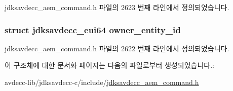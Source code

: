jdksavdecc\+\_\+aem\+\_\+command.\+h 파일의 2623 번째 라인에서 정의되었습니다.

\subsubsection[{\texorpdfstring{owner\+\_\+entity\+\_\+id}{owner_entity_id}}]{\setlength{\rightskip}{0pt plus 5cm}struct {\bf jdksavdecc\+\_\+eui64} owner\+\_\+entity\+\_\+id}\hypertarget{structjdksavdecc__aem__command__acquire__entity_aae4e95a44a1a5e23f8e4415c32aed989}{}\label{structjdksavdecc__aem__command__acquire__entity_aae4e95a44a1a5e23f8e4415c32aed989}


jdksavdecc\+\_\+aem\+\_\+command.\+h 파일의 2622 번째 라인에서 정의되었습니다.



이 구조체에 대한 문서화 페이지는 다음의 파일로부터 생성되었습니다.\+:\begin{DoxyCompactItemize}
\item 
avdecc-\/lib/jdksavdecc-\/c/include/\hyperlink{jdksavdecc__aem__command_8h}{jdksavdecc\+\_\+aem\+\_\+command.\+h}\end{DoxyCompactItemize}
